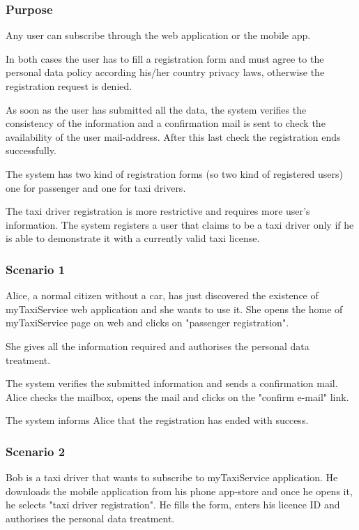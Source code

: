 \label{user-registration}
\subsubsection{Purpose}
Any user can subscribe through the web application or the mobile app. 

In both cases the user has to fill a registration form and must agree to the personal data policy according his/her country privacy laws, otherwise the registration request is denied.

As soon as the user has submitted all the data, the system verifies the consistency of the information and a confirmation mail is sent to check the availability of the user mail-address.  After this last check the registration ends successfully.

The system has two kind of registration forms (so two kind of registered users) one for passenger and one for taxi drivers.

The taxi driver registration is more restrictive and requires more user's information.
The system registers a user that claims to be a taxi driver only if he is able to demonstrate it with a currently valid taxi license.


\subsubsection{Scenario 1}
Alice, a normal citizen without a car, has just discovered the existence of myTaxiService web application and she wants to use it. 
She opens the home of myTaxiService page on web and clicks on "passenger registration". 

She gives all the information required and authorises the personal data treatment. 

The system verifies the submitted information and sends a confirmation mail.
Alice checks the mailbox, opens the mail and clicks on the "confirm e-mail" link. 

The system informs Alice that the registration has ended with success.

\subsubsection{Scenario 2}
Bob is a taxi driver that wants to subscribe to myTaxiService application. 
He downloads the mobile application from his phone app-store and once he opens it, he selects "taxi driver registration". 
He fills the form, enters his licence ID and authorises the personal data treatment.

